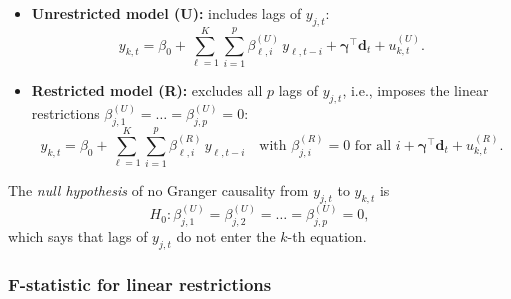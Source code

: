 \documentclass[11pt]{article}
\begin{document}
\begin{itemize}[leftmargin=1.5em]
  \item \textbf{Unrestricted model (U):} includes lags of $y_{j,t}$:
  \begin{equation}
    y_{k,t}
    = \beta_{0}
    + \sum_{\ell=1}^K \sum_{i=1}^p \beta_{\ell,i}^{(U)}\, y_{\ell,t-i}
    + \boldsymbol{\gamma}^\top \mathbf{d}_t
    + u_{k,t}^{(U)}.
    \label{eq:gc-unrestricted}
  \end{equation}

  \item \textbf{Restricted model (R):} excludes all $p$ lags of $y_{j,t}$,
        i.e., imposes the linear restrictions
        $\beta_{j,1}^{(U)} = \dots = \beta_{j,p}^{(U)} = 0$:
  \begin{equation}
    y_{k,t}
    = \beta_{0}
    + \sum_{\ell=1}^K \sum_{i=1}^p \beta_{\ell,i}^{(R)}\, y_{\ell,t-i}
      \quad \text{with } \beta_{j,i}^{(R)} = 0 \text{ for all } i
    + \boldsymbol{\gamma}^\top \mathbf{d}_t
    + u_{k,t}^{(R)}.
    \label{eq:gc-restricted}
  \end{equation}
\end{itemize}

The \emph{null hypothesis} of no Granger causality from $y_{j,t}$ to
$y_{k,t}$ is
\begin{equation}
  H_0:
  \beta_{j,1}^{(U)} = \beta_{j,2}^{(U)} = \dots = \beta_{j,p}^{(U)} = 0,
\end{equation}
which says that lags of $y_{j,t}$ do not enter the $k$-th equation.

\subsubsection{F-statistic for linear restrictions}
\end{document}

